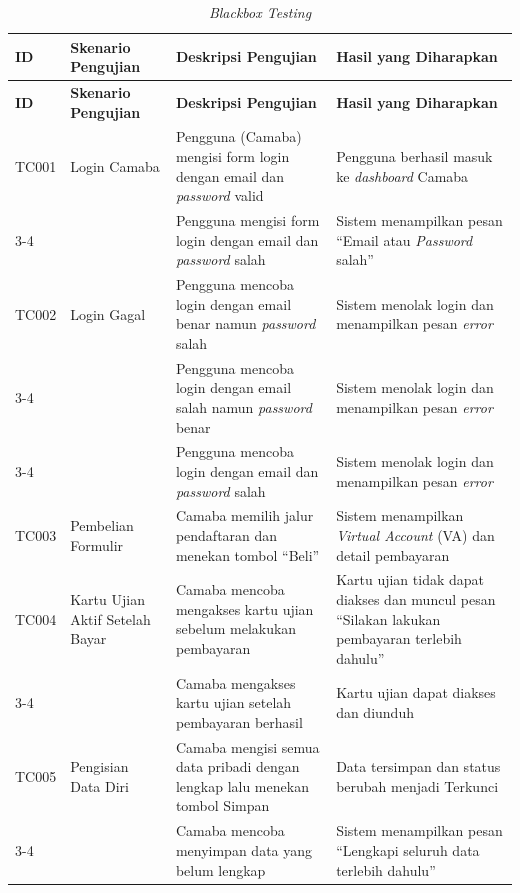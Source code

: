\begin{longtable}{|p{}|p{}|p{}|p{}|}
	\caption{\textit{Blackbox Testing}}
	\label{table:3.blackboxtesting}\\
	\hline
	\textbf{ID} & \textbf{Skenario Pengujian} & \textbf{Deskripsi Pengujian} & \textbf{Hasil yang Diharapkan} \\
	\hline
	\endfirsthead
	\hline
	\textbf{ID} & \textbf{Skenario Pengujian} & \textbf{Deskripsi Pengujian} & \textbf{Hasil yang Diharapkan} \\
	\hline
	\endhead
	TC001 & Login Camaba & Pengguna (Camaba) mengisi form login dengan email dan \textit{password} valid & Pengguna berhasil masuk ke \textit{dashboard} Camaba \\
	\cline{3-4}
	& & Pengguna mengisi form login dengan email dan \textit{password} salah & Sistem menampilkan pesan ``Email atau \textit{Password} salah'' \\
	\hline
	TC002 & Login Gagal & Pengguna mencoba login dengan email benar namun \textit{password} salah & Sistem menolak login dan menampilkan pesan \textit{error} \\
	\cline{3-4}
	& & Pengguna mencoba login dengan email salah namun \textit{password} benar & Sistem menolak login dan menampilkan pesan \textit{error} \\
	\cline{3-4}
	& & Pengguna mencoba login dengan email dan \textit{password} salah & Sistem menolak login dan menampilkan pesan \textit{error} \\
	\hline
	TC003 & Pembelian Formulir & Camaba memilih jalur pendaftaran dan menekan tombol ``Beli'' & Sistem menampilkan \textit{Virtual Account} (VA) dan detail pembayaran \\
	\hline
	TC004 & Kartu Ujian Aktif Setelah Bayar & Camaba mencoba mengakses kartu ujian sebelum melakukan pembayaran & Kartu ujian tidak dapat diakses dan muncul pesan ``Silakan lakukan pembayaran terlebih dahulu'' \\
	\cline{3-4}
	& & Camaba mengakses kartu ujian setelah pembayaran berhasil & Kartu ujian dapat diakses dan diunduh \\
	\hline
	TC005 & Pengisian Data Diri & Camaba mengisi semua data pribadi dengan lengkap lalu menekan tombol Simpan & Data tersimpan dan status berubah menjadi Terkunci \\
	\cline{3-4}
	& & Camaba mencoba menyimpan data yang belum lengkap & Sistem menampilkan pesan ``Lengkapi seluruh data terlebih dahulu'' \\

\end{longtable}
